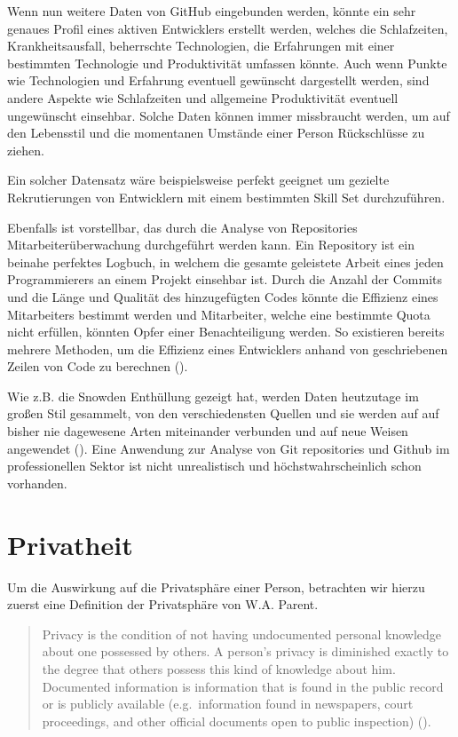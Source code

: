 \documentclass[12pt,a4paper]{article}
\begin{document}
Wenn nun weitere Daten von GitHub eingebunden werden, könnte ein sehr genaues Profil eines aktiven Entwicklers erstellt werden, welches die Schlafzeiten, Krankheitsausfall, beherrschte Technologien, die Erfahrungen mit einer bestimmten Technologie und Produktivität umfassen könnte.
Auch wenn Punkte wie Technologien und Erfahrung eventuell gewünscht dargestellt werden, sind andere Aspekte wie Schlafzeiten und allgemeine Produktivität eventuell ungewünscht einsehbar.
Solche Daten können immer missbraucht werden, um auf den Lebensstil und die momentanen Umstände einer Person Rückschlüsse zu ziehen.

Ein solcher Datensatz wäre beispielsweise perfekt geeignet um gezielte Rekrutierungen von Entwicklern mit einem bestimmten Skill Set durchzuführen.

Ebenfalls ist vorstellbar, das durch die Analyse von Repositories Mitarbeiterüberwachung durchgeführt werden kann.
Ein Repository ist ein beinahe perfektes Logbuch, in welchem die gesamte geleistete Arbeit eines jeden Programmierers an einem Projekt einsehbar ist.
Durch die Anzahl der Commits und die Länge und Qualität des hinzugefügten Codes könnte die Effizienz eines Mitarbeiters bestimmt werden und Mitarbeiter, welche eine bestimmte Quota nicht erfüllen, könnten Opfer einer Benachteiligung werden.
So existieren bereits mehrere Methoden, um die Effizienz eines Entwicklers anhand von geschriebenen Zeilen von Code zu berechnen (\cite{inproc:measuring-loc}).

Wie z.B. die Snowden Enthüllung gezeigt hat, werden Daten heutzutage im großen Stil gesammelt, von den verschiedensten Quellen und sie werden auf auf bisher nie dagewesene Arten miteinander verbunden und auf neue Weisen angewendet (\cite[p.~4]{article:snowden}).
Eine Anwendung zur Analyse von Git repositories und Github im professionellen Sektor ist nicht unrealistisch und höchstwahrscheinlich schon vorhanden.


\section{Privatheit}

Um die Auswirkung auf die Privatsphäre einer Person, betrachten wir hierzu zuerst eine Definition der Privatsphäre von W.A. Parent.

\begin{quote}
Privacy is the condition of not having undocumented personal knowledge about one possessed by others. A person's privacy is diminished exactly to the degree that others possess this kind of knowledge about him.
Documented information is information that is found in the public record or is publicly available (e.g.~information found in newspapers, court proceedings, and other official documents open to public inspection) (\cite[p.~203]{paper:privacymorality}).
\end{quote}
\end{document}
